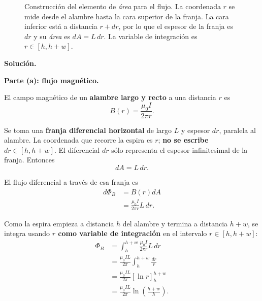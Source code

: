 \documentclass[11pt]{article}
\newcommand{\soluciontitulo}{%
  \par\medskip
  \noindent\textbf{Solución.}\par
  \smallskip
}
\newcommand{\paso}[1]{%
  \par\medskip
  \noindent\textbf{#1}\par
  \vspace{0.1em}%
}
\begin{document}
\begin{figure}[H]
\caption{Construcci\'on del elemento de \textit{\'area} para el flujo. La coordenada $r$ se mide desde el alambre hasta la cara superior de la franja. La cara inferior est\'a a distancia $r+dr$, por lo que el espesor de la franja es $dr$ y su \textit{\'area} es $dA=L\,dr$. La variable de integraci\'on es $r\in[h,h+w]$.}
\label{fig:p4_alambre}
\end{figure}


\soluciontitulo

\paso{Parte (a): flujo magn\'etico.}
El campo magn\'etico de un \textbf{alambre largo y recto} a una distancia $r$ es
\begin{equation*}
    B(r)=\frac{\mu_0 I}{2\pi r}.
\end{equation*}

Se toma una \textbf{franja diferencial horizontal} de largo $L$ y espesor $dr$, paralela al alambre. La coordenada que recorre la espira es $r$; \textbf{no se escribe $dr\in[h,h+w]$}. El diferencial $dr$ s\'olo representa el espesor infinitesimal de la franja. Entonces
\begin{equation*}
    dA=L\,dr.
\end{equation*}

El flujo diferencial a trav\'es de esa franja es
\begin{align*}
    d\Phi_B
    &=B(r)dA \\
    &=\frac{\mu_0 I}{2\pi r}L\,dr.
\end{align*}

Como la espira empieza a distancia $h$ del alambre y termina a distancia $h+w$, se integra usando \textbf{$r$ como variable de integraci\'on} en el intervalo \textbf{$r\in[h,h+w]$}:
\begin{align*}
    \Phi_B
    &=\int_h^{h+w}\frac{\mu_0 I}{2\pi r}L\,dr \\
    &=\frac{\mu_0 I L}{2\pi}\int_h^{h+w}\frac{dr}{r} \\
    &=\frac{\mu_0 I L}{2\pi}\left[\ln r\right]_h^{h+w} \\
    &=\frac{\mu_0 I L}{2\pi}\ln\left(\frac{h+w}{h}\right).
\end{align*}
\end{document}
